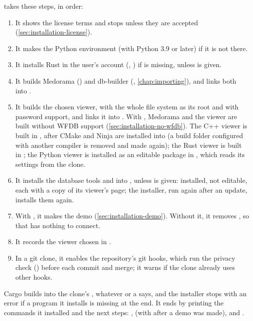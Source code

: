  takes these steps, in order:
\begin{enumerate}
\item It shows the license terms and stops unless they are accepted
  (\cref{sec:installation-license}).
\item It makes the Python environment  (with Python 3.9 or later) if it is not
  there.
\item It installs Rust in the user's account (,
  ) if  is missing, unless  is given.
\item It builds Medorama () and db-builder
  (, \cref{chap:importing}), and links both into .
\item It builds the chosen viewer, with the whole file system as its root and with password
  support, and links it into . With , Medorama and the viewer are
  built without WFDB support (\cref{sec:installation-no-wfdb}). The C++ viewer is built in
  , after CMake and Ninja are installed into
   (a build folder configured with another compiler is removed and made again); the
  Rust viewer is built in ; the Python viewer is installed as an editable
  package in , which reads its settings from the clone.
\item It installs the database tools  and  into , unless
   is given: installed, not editable, each with a copy of its viewer's page; the
  installer, run again after an update, installs them again.
\item With , it makes the demo (\cref{sec:installation-demo}). Without it, it removes
  , so that  has nothing to connect.
\item It records the viewer chosen in .
\item In a git clone, it enables the repository's git hooks, which run the privacy check
  () before each commit and merge; it warns if the clone
  already uses other hooks.
\end{enumerate}
Cargo builds into the clone's , whatever  or a
 says, and the installer stops with an error if a program it installs is
missing at the end.
It ends by printing the commands it installed and the next steps:
,  (with 
after a demo was made),  and
.

